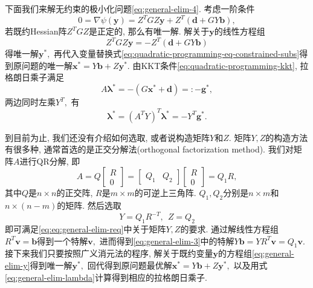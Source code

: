 \documentclass{SBCbookchapter}
\newcommand{\V}[1]{{\bm{#1}}}
\numberwithin{equation}{section}
\begin{document}
下面我们来解无约束的极小化问题\eqref{eq:general-elim-4}. 考虑一阶条件
\begin{equation}
\label{eq:general-elim-5}
0 = \nabla \psi (\V{y}) = Z^T G Z \V{y} + Z^T \left( \V{d} + G Y \V{b} \right),
\end{equation}
若既约Hessian阵$Z^T G Z$是正定的, 那么有唯一解. 解关于$\V{y}$的线性方程组
\begin{equation}
\label{eq:general-elim-y}
Z^T G Z \V{y} = - Z^T \left( \V{d} + G Y \V{b} \right)
\end{equation}
得唯一解$\V{y}^*,$ 再代入变量替换式\eqref{eq:quadratic-programming-eq-constrained-subs}得到原问题的唯一解$\V{x}^* = Y \V{b} + Z \V{y}^*.$ 由KKT条件\eqref{eq:quadratic-programming-kkt}, 拉格朗日乘子满足
\begin{equation}
\label{eq:general-elim-lagrange}
A \V{\lambda}^* = -\left( G \V{x}^* + \V{d} \right) =: - \V{g}^*,
\end{equation}
两边同时左乘$Y^T,$ 有
\begin{equation}
\label{eq:general-elim-lambda}
\V{\lambda}^* = \left( A^T Y \right)^T \V{\lambda}^* = -Y^T \V{g}^*.
\end{equation}

到目前为止, 我们还没有介绍如何选取, 或者说构造矩阵$Y$和$Z.$ 矩阵$Y, Z$的构造方法有很多种, 通常首选的是正交分解法(orthogonal factorization method). 我们对矩阵$A$进行QR分解, 即
\begin{equation}
\label{eq:quadratic-programming-qr-decomp-1}
A = Q \begin{bmatrix} R \\ 0 \end{bmatrix} = \begin{bmatrix} Q_1 & Q_2 \end{bmatrix} \begin{bmatrix} R \\ 0 \end{bmatrix} = Q_1 R,
\end{equation}
其中$Q$是$n \times n$的正交阵, $R$是$m \times m$的可逆上三角阵. $Q_1, Q_2$分别是$n \times m$和$n \times (n - m)$的矩阵. 然后选取
\begin{equation}
\label{eq:quadratic-programming-qr-decomp-2}
Y = Q_1 R^{-T}, ~~ Z = Q_2
\end{equation}
即可满足\eqref{eq:eq:general-elim-req}中关于矩阵$Y, Z$的要求. 通过解线性方程组$R^T \V{v} = \V{b}$得到一个特解$\V{v},$ 进而得到\eqref{eq:general-elim-3}中的特解$Y \V{b} = Y R^T \V{v} = Q_1 \V{v}.$ 接下来我们只要按照广义消元法的程序, 解关于既约变量$\V{y}$的方程组\eqref{eq:general-elim-y}得到唯一解$\V{y}^*,$ 回代得到原问题最优解$\V{x}^* = Y \V{b} + Z \V{y}^*,$ 以及用式\eqref{eq:general-elim-lambda}计算得到相应的拉格朗日乘子.
\end{document}
